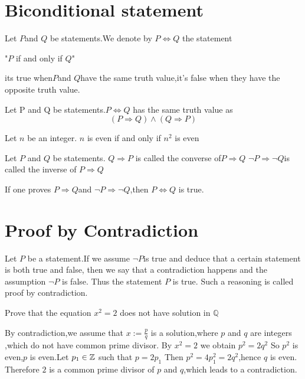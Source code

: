 \documentclass{book}
\begin{document}
\section{Biconditional statement}
\begin{definitionenv}
    Let $P$and $Q$ be statements.We denote by $P\Leftrightarrow Q$ the statement
    \begin{center}
        "$P$ if and only if $Q$"
    \end{center}
    its true when$P$and $Q$have the same truth value,it's false when they have the opposite truth value.
\end{definitionenv}
\begin{propositionenv}
    Let P and Q be statements.$P \Leftrightarrow Q$ has the same truth value as 
    $$(P\Rightarrow Q)\wedge (Q\Rightarrow P)$$
\end{propositionenv}
\begin{exampleenv}
    Let $n$ be an integer.
    \newline
    $n$ is even if and only if $n^2$ is even 
\end{exampleenv}
\begin{definitionenv}
    Let $P$ and $Q$ be statements.
    \newline
    $Q\Rightarrow P$ is called the converse of$P\Rightarrow Q$
    \newline
    $\neg P \Rightarrow \neg Q$is called the inverse of $P\Rightarrow Q$ 
\end{definitionenv}
\begin{remark}
    If one proves $P\Rightarrow Q$and $\neg P\Rightarrow \neg Q$,then $P \Leftrightarrow Q$ is true.
\end{remark}




\section{Proof by Contradiction}
\begin{definitionenv}
    Let $P$ be a statement.If we assume $\neg P$is true and deduce that a certain statement is both true and false, then we say that a contradiction happens and the assumption $\neg P$ is false. Thus the statement $P$ is true. Such a reasoning is called proof by contradiction.
\end{definitionenv}
\begin{exampleenv}
    Prove that the equation $x^2=2$ does not have solution in $\mathbb{Q}$
    \begin{proofenv}
        By contradiction,we assume that $x:=\frac{p}{q}$ is a solution,where $p$ and $q$ are integers ,which do not have common prime divisor.
        \newline
        By $x^2=2$ we obtain $p^2=2q^2$
        So $p^2$ is even,$p$ is even.Let $p_1\in \mathbb{Z}$ such that $p=2p_1$
        Then $p^2=4p_1^2=2q^2$,hence $q$ is even.
        \newline
        Therefore $2$ is a common prime divisor of $p$ and $q$,which leads to a contradiction.
    \end{proofenv}
\end{exampleenv}
\end{document}

